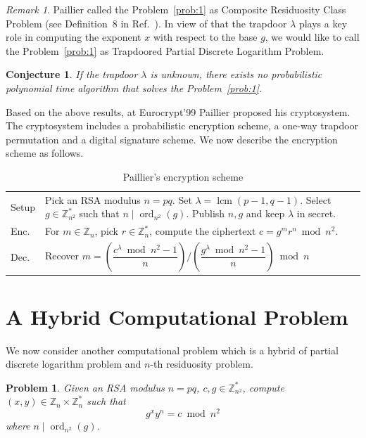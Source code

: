 \documentclass[11pt,a4paper]{article}
\newtheorem{problem}[definition]{Problem}
\newtheorem{conjecture}[definition]{Conjecture}
\theoremstyle{remark}
\newtheorem{remark}{Remark}
\newcommand{\Z}{\mathbb{Z}}
\newcommand{\ord}{\operatorname{ord}}
\newcommand{\lcm}{\operatorname{lcm}}
\begin{document}
\begin{remark}
Paillier called the Problem~\ref{prob:1} as Composite Residuosity Class Problem (see Definition~8 in Ref.~\cite{Pai99}). In view of that the trapdoor $\lambda$ plays a key role in computing the exponent $x$ with respect to the base $g$, we would like to call the Problem~\ref{prob:1} as Trapdoored Partial Discrete Logarithm Problem.
\end{remark}

\begin{conjecture}
If the trapdoor $\lambda$ is unknown, there exists no probabilistic polynomial time algorithm that solves the Problem~\ref{prob:1}.
\end{conjecture}

Based on the above results, at Eurocrypt'99 Paillier proposed his cryptosystem. The cryptosystem includes a probabilistic encryption scheme, a one-way trapdoor permutation and a digital signature scheme. We now describe the encryption scheme as follows.

\begin{table}[h]
\centering
\caption{Paillier's encryption scheme}
\begin{tabular}{@{}l p{}@{}}
\toprule
Setup & Pick an RSA modulus $n=pq$. Set $\lambda=\lcm(p-1,q-1)$. Select $g\in\Z_{n^2}^*$ such that $n\mid\ord_{n^2}(g)$. Publish $n,g$ and keep $\lambda$ in secret.\\
Enc. & For $m\in\Z_n$, pick $r\in\Z_n^*$, compute the ciphertext $c = g^m r^n \bmod n^2$.\\
Dec. & Recover $m = \left(\dfrac{c^\lambda \bmod n^2 - 1}{n}\right) \Big/ \left(\dfrac{g^\lambda \bmod n^2 - 1}{n}\right) \bmod n$\\
\bottomrule
\end{tabular}
\end{table}

\section{A Hybrid Computational Problem}\label{sec:hybrid}

We now consider another computational problem which is a hybrid of partial discrete logarithm problem and $n$-th residuosity problem.

\begin{problem}\label{prob:2}
Given an RSA modulus $n=pq$, $c,g\in\Z_{n^2}^*$, compute $(x,y)\in\Z_n\times\Z_n^*$ such that
\[
g^x y^n = c \bmod n^2
\]
where $n\mid\ord_{n^2}(g)$.
\end{problem}
\end{document}
